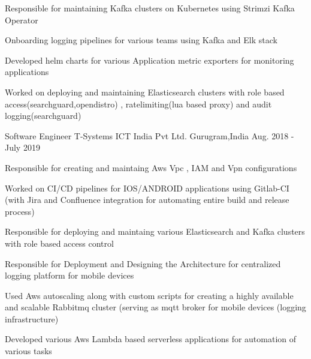 \begin{cventries}
{\begin{cvitems}
               \item { Responsible for maintaining  Kafka clusters on Kubernetes using  Strimzi Kafka Operator }
               \item { Onboarding logging pipelines for various teams using Kafka and Elk stack }
               \item { Developed helm charts for various Application metric exporters for monitoring applications  }
               \item { Worked on deploying and maintaining Elasticsearch clusters with role based access(searchguard,opendistro) , ratelimiting(lua based proxy) and audit logging(searchguard)} 		
	  \end{cvitems}
    }
    \cventry
    {Software Engineer} %
    {T-Systems ICT India Pvt Ltd.} %
    {Gurugram,India} %
    {Aug. 2018 - July 2019} %
    {
      \begin{cvitems} %
	    \item { Responsible for creating and maintaing Aws Vpc , IAM and Vpn configurations}
		\item {Worked on CI/CD pipelines for IOS/ANDROID applications using Gitlab-CI (with Jira and Confluence integration for automating entire build and release process)}
		\item {Responsible for deploying and maintaing various Elasticsearch and Kafka clusters with role based access control }
		\item  { Responsible for Deployment and Designing the  Architecture for centralized logging platform for mobile devices}
		\item { Used Aws autoscaling along with custom scripts  for creating  a highly available and scalable   Rabbitmq cluster (serving as mqtt broker for mobile devices (logging infrastructure) }
		\item {Developed various  Aws Lambda based serverless applications for automation of various tasks }                   
	  \end{cvitems}
    }


\end{cventries}
